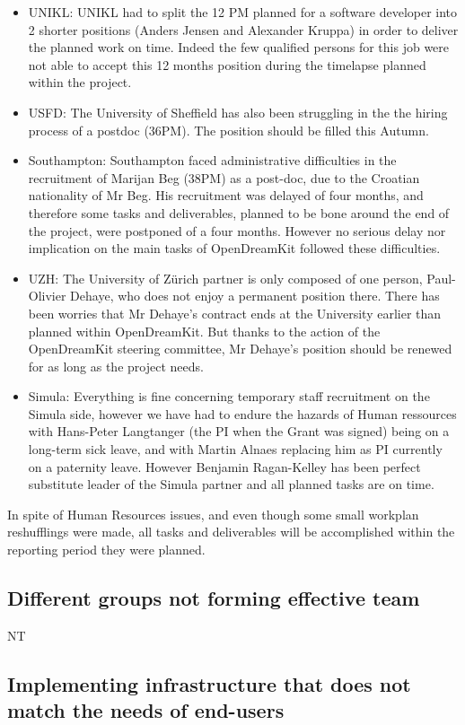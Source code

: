 \documentclass{../../Proposal/LaTeX-proposal/deliverablereport}
\begin{document}
\begin{itemize}
\item{UNIKL:} UNIKL had to split the 12 PM planned for a software developer into 2 shorter positions (Anders Jensen and Alexander Kruppa) in order to deliver the planned work on time. Indeed the few qualified persons for this job were not able to accept this 12 months position during the timelapse planned within the project.

\item{USFD:} The University of Sheffield has also been struggling in the the hiring process of a postdoc (36PM). The position should be filled this Autumn.

\item{Southampton:} Southampton faced administrative difficulties in the recruitment of Marijan Beg (38PM) as a post-doc, due to the Croatian nationality of Mr Beg. His recruitment was delayed of four months, and therefore some tasks and deliverables, planned to be bone around the end of the project, were postponed of a four months. However no serious delay nor implication on the main tasks of OpenDreamKit followed these difficulties.
\item{UZH:} The University of Zürich partner is only composed of one person, Paul-Olivier Dehaye, who does not enjoy a permanent position there. There has been worries that Mr Dehaye's contract ends at the University earlier than planned within OpenDreamKit. But thanks to the action of the OpenDreamKit steering committee, Mr Dehaye's position should be renewed for as long as the project needs.
\item{Simula:} Everything is fine concerning temporary staff recruitment on the Simula side, however we have had to endure the hazards of Human ressources with Hans-Peter Langtanger (the PI when the Grant was signed) being on a long-term sick leave, and with Martin Alnaes replacing him as PI currently on a paternity leave. However Benjamin Ragan-Kelley has been perfect  substitute leader of the Simula partner and all planned tasks are on time.
\end{itemize}

In spite of Human Resources issues, and even though some small workplan reshufflings were made, all tasks and deliverables will be accomplished within the reporting period they were planned.

\subsection{Different groups not forming effective team}
NT
\subsection{Implementing infrastructure that does not match the needs of end-users}
\end{document}
